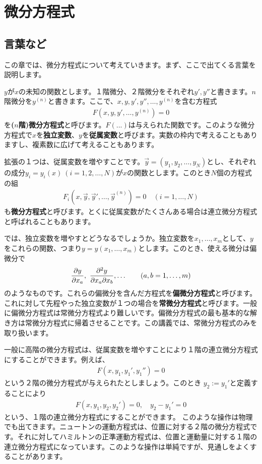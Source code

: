 \documentclass[report,paper=a4, fontsize=12pt, line_length=16cm, number_of_lines=33,dvipdfmx]{jlreq}
\numberwithin{equation}{section}
\newcommand{\strong}[1]{\textsf{\bfseries #1}}
\newcommand{\yv}{\vec{y}}
\begin{document}
\chapter{微分方程式}\label{sec:ode}
\section{言葉など}
この章では、微分方程式について考えていきます。まず、ここで出てくる言葉を説明します。

$y$が$x$の未知の関数とします。１階微分、２階微分をそれぞれ$y',y''$と書きます。$n$階微分を$y^{(n)}$と書きます。ここで、$x,y,y',y'',\dots,y^{(n)}$を含む方程式
\begin{align}
  F(x,y,y',\dots,y^{(n)})=0
\end{align}
を\strong{($n$階)微分方程式}と呼びます。$F(...)$は与えられた関数です。このような微分方程式で$x$を\strong{独立変数}、$y$を\strong{従属変数}と呼びます。実数の枠内で考えることもありますし、複素数に広げて考えることもあります。

拡張の１つは、従属変数を増やすことです。$\yv=(y_1,y_2,\dots,y_N)$とし、それぞれの成分$y_i=y_i(x)\ (i=1,2,\dots,N)$が$x$の関数とします。このとき$N$個の方程式の組
\begin{align}
  F_i(x,\yv,\yv',\dots,\yv^{(n)})=0\quad (i=1,\dots,N)
\end{align}
も\strong{微分方程式}と呼びます。とくに従属変数がたくさんある場合は連立微分方程式と呼ばれることもあります。

では、独立変数を増やすとどうなるでしょうか。独立変数を$x_1,\dots,x_m$として、$y$をこれらの関数、つまり$y=y(x_1,\dots,x_m)$とします。このとき、使える微分は偏微分で
\begin{align}
  \pdv{y}{x_a},\ \pdv{y}{x_a}{x_b},\dots\qquad (a,b=1,\dots,m)
\end{align}
のようなものです。これらの偏微分を含んだ方程式を\strong{偏微分方程式}と呼びます。これに対して先程やった独立変数が１つの場合を\strong{常微分方程式}と呼びます。一般に偏微分方程式は常微分方程式より難しいです。偏微分方程式の最も基本的な解き方は常微分方程式に帰着させることです。この講義では、常微分方程式のみを取り扱います。

一般に高階の微分方程式は、従属変数を増やすことにより１階の連立微分方程式にすることができます。例えば、
\begin{align}
  F(x,y_1,y_1',y_1'')=0
\end{align}
という２階の微分方程式が与えられたとしましょう。このとき
$y_2:=y_1'$と定義することにより
\begin{align}
  F(x,y_1,y_2,y_2')=0,\quad y_2-y_1'=0
\end{align}
という、１階の連立微分方程式にすることができます。
このような操作は物理でも出てきます。ニュートンの運動方程式は、位置に対する２階の微分方程式です。それに対してハミルトンの正準運動方程式は、位置と運動量に対する１階の連立微分方程式になっています。このような操作は単純ですが、見通しをよくすることがあります。
\end{document}
